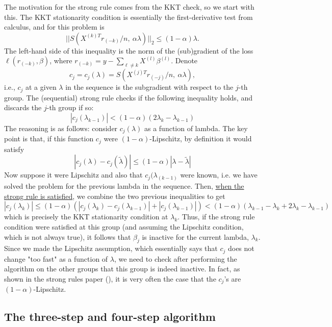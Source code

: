 \documentclass[titlepage]{article}
\begin{document}
The motivation for the strong rule comes from the KKT check, so we start with this. The KKT stationarity condition \citep{boyd2004convex} is essentially the first-derivative test from calculus, and for this problem is 
\[
||S(X^{(k)T}r_{(-k)}/n,\ \alpha\lambda)||_2 \leq (1-\alpha)\lambda.
\]
The left-hand side of this inequality is the norm of the (sub)gradient of the loss $\ell(r_{(-k)},\beta)$, where $r_{(-k)}= y - \sum_{\ell \neq k} X^{(l)}\beta^{(l)}$.
Denote 
\[
c_j = c_j(\lambda) = S(X^{(j)T}r_{(-j)}/n,\ \alpha\lambda),
\]
i.e., $c_j$ at a given $\lambda$ in the sequence is the subgradient with respect to the $j$-th group.
The (sequential) strong rule checks if the following inequality holds, and discards the $j$-th group if so:
\begin{equation}
|c_j(\lambda_{k-1})| < (1-\alpha)(2\lambda_k - \lambda_{k-1})
\label{eq:strongcond}
\end{equation}
The reasoning is as follows: consider $c_j(\lambda)$ as a function of lambda. The key point is that, if this function $c_j$ were $(1-\alpha)$-Lipschitz, by definition it would satisfy
\[
|c_j(\lambda) - c_j(\tilde{\lambda})|\leq (1-\alpha)|\lambda-\tilde{\lambda}|
\]
Now suppose it were Lipschitz and also that $c_j(\lambda_{(k-1)}$ were known, i.e. we have solved the problem for the previous lambda in the sequence. Then, \underline{when the strong rule is satisfied}, we combine the two previous inequalities to get
\[
|c_j(\lambda_k)|\leq (1-\alpha)(|c_j(\lambda_k) - c_j(\lambda_{k-1})|+|c_j(\lambda_{k-1})|)<(1-\alpha)(\lambda_{k-1}-\lambda_k+2\lambda_{k}-\lambda_{k-1})
\]
which is precisely the KKT stationarity condition at $\lambda_k$. Thus, if the strong rule condition were satisfied at this group (and assuming the Lipschitz condition, which is not always true), it follows that $\beta_j$ is inactive for the current lambda, $\lambda_k$. Since we made the Lipschitz assumption, which essentially says that $c_j$ does not change "too fast" as a function of $\lambda$, we need to check after performing the algorithm on the other groups that this group is indeed inactive. In fact, as shown in the strong rules paper (), it is very often the case that the $c_j$'s are $(1-\alpha)$-Lipschitz.

\subsection{The three-step and four-step algorithm}
\end{document}
